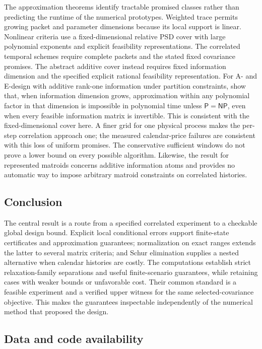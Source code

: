 The approximation theorems identify tractable promised classes rather than
predicting the runtime of the numerical prototypes. Weighted trace permits
growing packet and parameter dimensions because its local support is linear.
Nonlinear criteria use a fixed-dimensional relative PSD cover with large
polynomial exponents and explicit feasibility representations. The correlated
temporal schemes require complete packets and the stated fixed covariance
promises. The abstract additive cover instead requires fixed information
dimension and the specified explicit rational feasibility representation.
For A- and E-design with additive rank-one information under partition constraints,
\citet{BansalXu2026} show that, when information dimension grows, approximation
within any polynomial factor in that dimension is impossible in polynomial
time unless $\mathsf{P}=\mathsf{NP}$, even when every feasible information matrix
is invertible. This is consistent with the fixed-dimensional cover here.
A finer grid for one physical process makes the per-step
correlation approach one; the measured calendar-price failures are consistent
with this loss of uniform promises. The conservative sufficient windows do
not prove a lower bound on every possible algorithm. Likewise, the result for
represented matroids concerns additive information atoms and provides no automatic
way to impose arbitrary matroid constraints on correlated histories.

\subsection{Conclusion}

The central result is a route from a specified correlated experiment to a
checkable global design bound. Explicit local conditional errors support
finite-state certificates and approximation guarantees; normalization on exact
ranges extends the latter to several matrix criteria; and Schur
elimination supplies a nested alternative when calendar histories are costly.
The computations establish strict relaxation-family separations and useful
finite-scenario guarantees, while retaining cases with weaker bounds or
unfavorable cost. Their common standard is a feasible experiment and a verified
upper witness for the same selected-covariance objective. This makes the
guarantees inspectable independently of the numerical method that proposed
the design.

\subsection*{Data and code availability}

